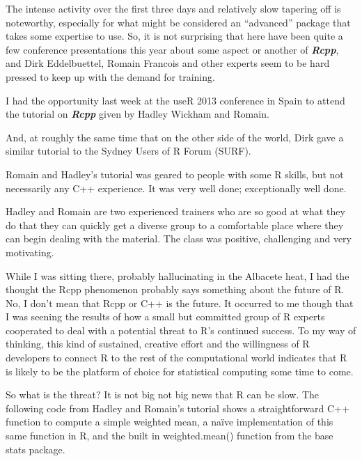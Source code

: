 \documentclass[]{article}
\begin{document}
The intense activity over the first three days and relatively slow tapering off is noteworthy, especially for what might be considered an “advanced” package that takes some expertise to use. So, it is not surprising that here have been quite a few conference presentations this year about some aspect or another of \textit{\textbf{Rcpp}}, and Dirk Eddelbuettel, Romain Francois and other experts seem to be hard pressed to keep up with the demand for training. 

I had the opportunity last week at the useR 2013 conference in Spain to attend the tutorial on \textit{\textbf{Rcpp}} given by Hadley Wickham and Romain. 

And, at roughly the same time that on the other side of the world, Dirk gave a similar tutorial to the Sydney Users of R Forum (SURF). 

Romain and Hadley's tutorial was geared to people with some R skills, but not necessarily any C++ experience. It was very well done; exceptionally well done. 

Hadley and Romain are two experienced trainers who are so good at what they do that they can quickly get a diverse group to a comfortable place where they can begin dealing with the material. The class was positive, challenging and very motivating.

While I was sitting there, probably hallucinating in the Albacete heat, I had the thought the Rcpp phenomenon probably says something about the future of R. No, I don’t mean that Rcpp or C++ is the future. It occurred to me though that I was seening the results of how a small but committed group of R experts cooperated to deal with a potential threat to R’s continued success. To my way of thinking, this kind of sustained, creative effort and the willingness of R developers to connect R to the rest of the computational world indicates that R is likely to be the platform of choice for statistical computing some time to come.

So what is the threat? It is not big not big news that R can be slow. The following code from Hadley and Romain's tutorial shows a straightforward C++ function to compute a simple weighted mean, a naïve implementation of this same function in R, and the built in weighted.mean() function from the base stats package.
\end{document}
